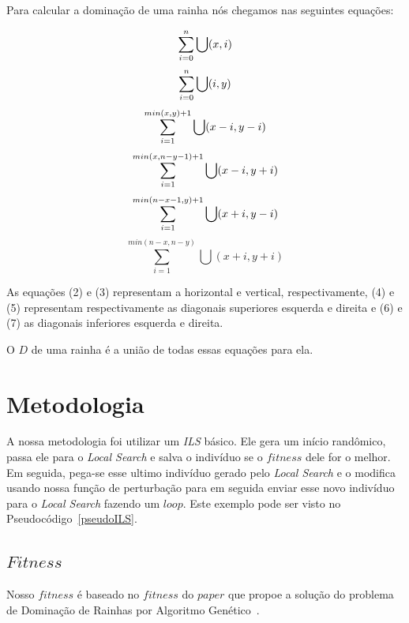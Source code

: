 \documentclass[
	article,			%
	11pt,				%
	oneside,			%
	a4paper,			%
	english,			%
	brazil,				%
	sumario=tradicional
	]{abntex2}
\begin{document}
Para calcular a dominação de uma rainha nós chegamos nas seguintes equações:

\begin{equation}
  \sum_{i=0}^{n} \bigcup (x, i) \\
\end{equation}
\begin{equation}
  \sum_{i=0}^{n} \bigcup (i, y) \\
\end{equation}
\begin{equation}
  \sum_{i=1}^{min(x,y)+1} \bigcup (x-i, y-i) \\
\end{equation}
\begin{equation}
  \sum_{i=1}^{min(x,n-y-1)+1} \bigcup (x-i, y+i) \\
\end{equation}
\begin{equation}
  \sum_{i=1}^{min(n-x-1,y)+1} \bigcup (x+i, y-i) \\
\end{equation}
\begin{equation}
  \sum_{i=1}^{min(n-x,n-y)} \bigcup (x+i, y+i)
\end{equation}

As equações (2) e (3) representam a horizontal e vertical, respectivamente, (4) e (5) representam respectivamente as diagonais superiores esquerda e direita e (6) e (7) as diagonais inferiores esquerda e direita.

O $D$ de uma rainha é a união de todas essas equações para ela.
\section{Metodologia}

A nossa metodologia foi utilizar um \textit{ILS} básico. Ele gera um início randômico, passa ele para o \textit{Local Search} e salva o indivíduo se o $fitness$ dele for o melhor. Em seguida, pega-se esse ultimo indivíduo gerado pelo \textit{Local Search} e o modifica usando nossa função de perturbação para em seguida enviar esse novo indivíduo para o \textit{Local Search} fazendo um $loop$. Este exemplo pode ser visto no Pseudocódigo~\ref{pseudoILS}.

\subsection{$Fitness$}

Nosso $fitness$ é baseado no $fitness$ do $paper$ que propoe a solução do problema de Dominação de Rainhas por Algoritmo Genético~\cite{alharbi2017genetic}.
\end{document}

